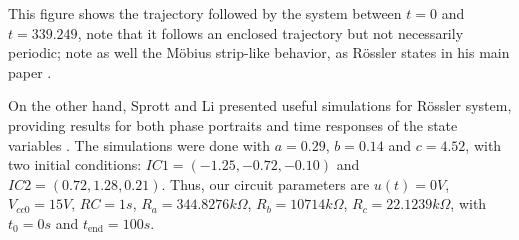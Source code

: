 This figure shows the trajectory followed by the system between $t=0$ and $t=339.249$, note that it follows an enclosed trajectory but not necessarily periodic; note as well the Möbius strip-like behavior, as Rössler states in his main paper \cite{rossler1976equation}.

On the other hand, Sprott and Li presented useful simulations for R\"ossler system, providing results for both phase portraits and time responses of the state variables \cite[Figs. 2 and 3]{sprott2017asymmetric}. The simulations were done with $a=0.29$, $b=0.14$ and $c = 4.52$, with two initial conditions: $IC1 = (-1.25, -0.72, -0.10)$ and $IC2 = (0.72,1.28,0.21)$. Thus, our circuit parameters are $u(t)=0V$, $V_{cc0}=15V$, $RC=1s$, $R_a=344.8276k\Omega$, $R_b=10714k\Omega$, $R_c=22.1239k\Omega$, with $t_0=0s$ and $t_{\text{end}}=100s$.

